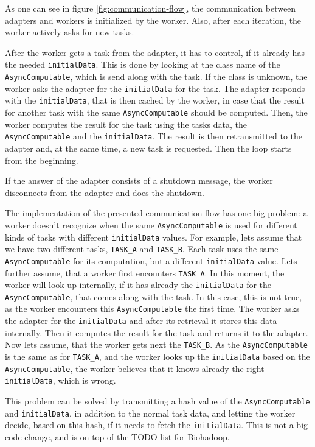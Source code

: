     As one can see in figure \ref{fig:communication-flow}, the communication between adapters and workers is initialized by the worker. Also, after each iteration, the worker actively asks for new tasks.
    
    After the worker gets a task from the adapter, it has to control, if it already has the needed \texttt{initialData}. This is done by looking at the class name of the \texttt{AsyncComputable}, which is send along with the task. If the class is unknown, the worker asks the adapter for the \texttt{initialData} for the task. The adapter responds with the \texttt{initialData}, that is then cached by the worker, in case that the result for another task with the same \texttt{AsyncComputable} should be computed. Then, the worker computes the result for the task using the tasks data, the \texttt{AsyncComputable} and the \texttt{initialData}. The result is then retransmitted to the adapter and, at the same time, a new task is requested. Then the loop starts from the beginning.
    
    If the answer of the adapter consists of a shutdown message, the worker disconnects from the adapter and does the shutdown.
    
    The implementation of the presented communication flow has one big problem: a worker doesn't recognize when the same  \texttt{AsyncComputable} is used for different kinds of tasks with different \texttt{initialData} values. For example, lets assume that we have two different tasks, \texttt{TASK\_A} and \texttt{TASK\_B}. Each task uses the same \texttt{AsyncComputable} for its computation, but a different \texttt{initialData} value. Lets further assume, that a worker first encounters \texttt{TASK\_A}. In this moment, the worker will look up internally, if it has already the \texttt{initialData} for the \texttt{AsyncComputable}, that comes along with the task. In this case, this is not true, as the worker encounters this \texttt{AsyncComputable} the first time. The worker asks the adapter for the \texttt{initialData} and after its retrieval it stores this data internally. Then it computes the result for the task and returns it to the adapter. Now lets assume, that the worker gets next the \texttt{TASK\_B}. As the \texttt{AsyncComputable} is the same as for \texttt{TASK\_A}, and the worker looks up the \texttt{initialData} based on the \texttt{AsyncComputable}, the worker believes that it knows already the right \texttt{initialData}, which is wrong.
    
    This problem can be solved by transmitting a hash value of the \texttt{AsyncComputable} and \texttt{initialData}, in addition to the normal task data, and letting the worker decide, based on this hash, if it needs to fetch the \texttt{initialData}. This is not a big code change, and is on top of the TODO list for Biohadoop.

